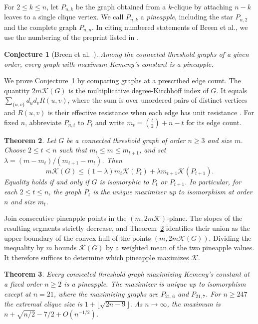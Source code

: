 \documentclass[11pt]{amsart}
\newtheorem{theorem}{Theorem}[section]
\newtheorem{conjecture}[theorem]{Conjecture}
\numberwithin{equation}{section}
\newcommand{\K}{\mathcal K}
\begin{document}
For $2\le k\le n$, let $P_{n,k}$ be the graph obtained from a
$k$-clique by attaching $n-k$ leaves to a single clique vertex. We call
$P_{n,k}$ a \emph{pineapple}, including the star $P_{n,2}$ and the
complete graph $P_{n,n}$. In citing numbered statements of Breen et al.,
we use the numbering of the preprint listed in \cite{Breen}.

\begin{conjecture}[Breen et al.\ {\cite[Conjecture 3.13]{Breen}}]\label{conj:pineapple}
Among the connected threshold graphs of a given order, every graph
with maximum Kemeny's constant is a pineapple.
\end{conjecture}

We prove Conjecture~\ref{conj:pineapple} by comparing graphs at a
prescribed edge count. The quantity $2m\K(G)$ is the multiplicative
degree-Kirchhoff index of $G$. It equals
$\sum_{\{u,v\}}d_ud_v R(u,v)$, where the sum is over unordered
pairs of distinct vertices and $R(u,v)$ is their effective resistance
when each edge has unit resistance \cite{CZ}. For fixed $n$, abbreviate
$P_{n,t}$ to $P_t$ and write $m_t=\binom t2+n-t$ for its edge count.

\begin{theorem}\label{th:comparison}
Let $G$ be a connected threshold graph of order $n\ge3$ and size $m$.
Choose $2\le t<n$ such that $m_t\le m\le m_{t+1}$, and set
$\lambda=(m-m_t)/(m_{t+1}-m_t)$. Then
\[
 m\K(G)\le (1-\lambda)m_t\K(P_t)
               +\lambda m_{t+1}\K(P_{t+1}).
\]
Equality holds if and only if $G$ is isomorphic to $P_t$ or $P_{t+1}$.
In particular, for each $2\le t\le n$, the graph $P_t$ is the unique
maximizer up to isomorphism at order $n$ and size $m_t$.
\end{theorem}

Join consecutive pineapple points in the $(m,2m\K)$-plane.
The slopes of the resulting segments strictly decrease, and
Theorem~\ref{th:comparison} identifies their union as the upper boundary
of the convex hull of the points $(m,2m\K(G))$. Dividing the
inequality by $m$ bounds $\K(G)$ by a weighted mean of the two
pineapple values. It therefore suffices to determine which pineapple
maximizes $\K$.

\begin{theorem}\label{th:main}
Every connected threshold graph maximizing Kemeny's constant at a fixed
order $n\ge2$ is a pineapple. The maximizer is unique up to isomorphism
except at $n=21$, where the maximizing graphs are $P_{21,6}$ and
$P_{21,7}$. For $n\ge247$ the extremal clique size is
$1+\lfloor\sqrt{2n-9}\rfloor$. As $n\to\infty$, the maximum is
$n+\sqrt{n/2}-7/2+O(n^{-1/2})$.
\end{theorem}
\end{document}

